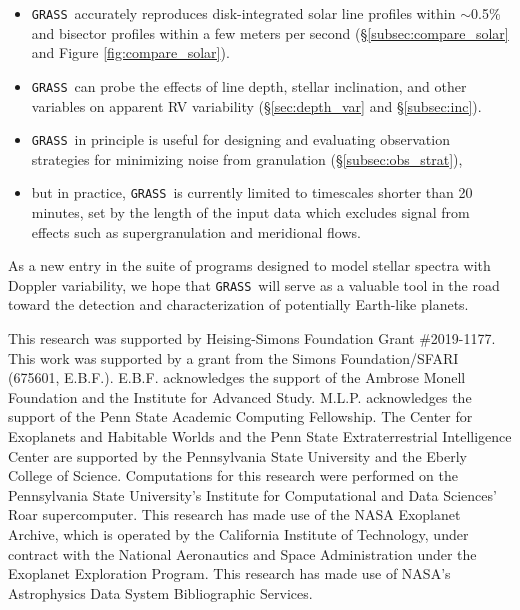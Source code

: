 \documentclass[twocolumn]{aastex63}
\newcommand{\grass}{\texttt{GRASS}}
\newcommand{\revise}[1]{#1}
\begin{document}
\begin{itemize}
    \item \grass\  accurately reproduces disk-integrated solar line profiles within $\sim$0.5\% and bisector profiles within a few meters per second (\S\ref{subsec:compare_solar} and Figure \ref{fig:compare_solar}). 
    \item \grass\ can probe the effects of line depth, stellar inclination, and other variables on apparent RV variability (\S\ref{sec:depth_var} and \S\ref{subsec:inc}).
    \item \grass\ in principle is useful for designing and evaluating observation strategies for minimizing noise from granulation (\S\ref{subsec:obs_strat}),
    \item \revise{but in practice, \grass\ is currently limited to timescales shorter than 20 minutes, set by the length of the input data which excludes signal from effects such as supergranulation and meridional flows.}
\end{itemize}

As a new entry in the suite of programs designed to model stellar spectra with Doppler variability, we hope that \grass\ will serve as a valuable tool in the road toward the detection and characterization of potentially Earth-like planets.

\acknowledgements
This research was supported by Heising-Simons Foundation Grant \#2019-1177. 
This work was supported by a grant from the Simons Foundation/SFARI (675601, E.B.F.). E.B.F. acknowledges the support of the Ambrose Monell Foundation and the Institute for Advanced Study. M.L.P. acknowledges the support of the Penn State Academic Computing Fellowship. The Center for Exoplanets and Habitable Worlds and the Penn State Extraterrestrial Intelligence Center are supported by the Pennsylvania State University and the Eberly College of Science. Computations for this research were performed on the Pennsylvania State University’s Institute for Computational and Data Sciences’ Roar supercomputer. This research has made use of the NASA Exoplanet Archive, which is operated by the California Institute of Technology, under contract with the National Aeronautics and Space Administration under the Exoplanet Exploration Program. This research has made use of NASA's Astrophysics Data System Bibliographic Services.  %

\software{\revise{\grass\ (v1.0; \citealt{GRASS})}, 
          EchelleCCFs (v0.1.11; \citealt{EchelleCCFs}), 
          \revise{Matplotlib (\citealt{Hunter2007})}}

\clearpage


\end{document}
